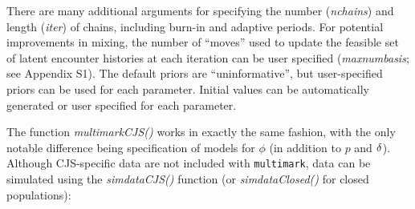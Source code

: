 \documentclass[12pt]{article}
\begin{document}
There are many additional arguments for specifying the number (\textit{nchains}) and length (\textit{iter}) of chains, including burn-in and adaptive periods. For potential improvements in mixing, the number of ``moves'' used to  update the feasible set of latent encounter histories at each iteration can be user specified (\textit{maxnumbasis}; see Appendix S1). The default priors are ``uninformative'', but user-specified priors can be used for each parameter. Initial values can be automatically generated or user specified for each parameter.

The function \textit{multimarkCJS()} works in exactly the same fashion, with the only notable difference being specification of models for $\phi$ (in addition to $p$ and ${\bf \delta}$). Although CJS-specific data are not included with \verb|multimark|, data can be simulated using the \textit{simdataCJS()} function (or \textit{simdataClosed()} for closed populations):
\end{document}
